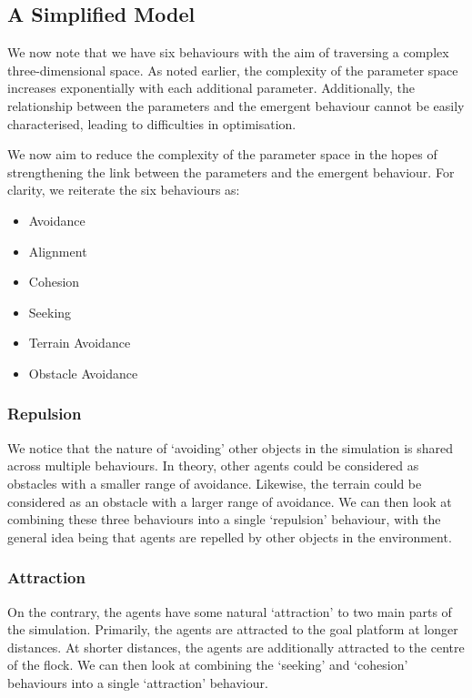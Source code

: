 \documentclass[12pt]{article}
\begin{document}
\subsection{A Simplified Model}
We now note that we have six behaviours with the aim of traversing a complex three-dimensional space. As noted earlier, the complexity of the parameter space increases exponentially with each additional parameter. Additionally, the relationship between the parameters and the emergent behaviour cannot be easily characterised, leading to difficulties in optimisation.

We now aim to reduce the complexity of the parameter space in the hopes of strengthening the link between the parameters and the emergent behaviour. For clarity, we reiterate the six behaviours as:

\begin{itemize}
    \item Avoidance
    \item Alignment
    \item Cohesion
    \item Seeking
    \item Terrain Avoidance
    \item Obstacle Avoidance
\end{itemize}

\subsubsection{Repulsion}
We notice that the nature of `avoiding' other objects in the simulation is shared across multiple behaviours. In theory, other agents could be considered as obstacles with a smaller range of avoidance. Likewise, the terrain could be considered as an obstacle with a larger range of avoidance. We can then look at combining these three behaviours into a single `repulsion' behaviour, with the general idea being that agents are repelled by other objects in the environment.

\subsubsection{Attraction}
On the contrary, the agents have some natural `attraction' to two main parts of the simulation. Primarily, the agents are attracted to the goal platform at longer distances. At shorter distances, the agents are additionally attracted to the centre of the flock. We can then look at combining the `seeking' and `cohesion' behaviours into a single `attraction' behaviour.
\end{document}
